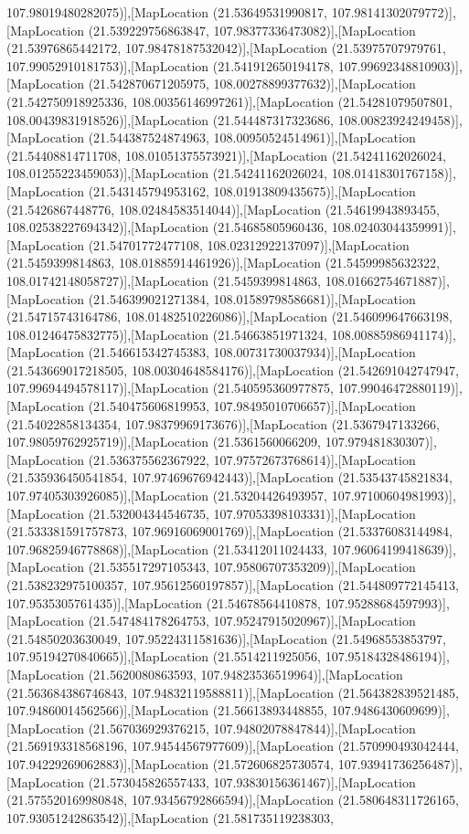 107.98019480282075)],[MapLocation (21.53649531990817, 107.98141302079772)],[MapLocation (21.539229756863847, 107.98377336473082)],[MapLocation (21.53976865442172, 107.98478187532042)],[MapLocation (21.53975707979761, 107.99052910181753)],[MapLocation (21.541912650194178, 107.99692348810903)],[MapLocation (21.542870671205975, 108.00278899377632)],[MapLocation (21.542750918925336, 108.00356146997261)],[MapLocation (21.54281079507801, 108.00439831918526)],[MapLocation (21.544487317323686, 108.00823924249458)],[MapLocation (21.544387524874963, 108.00950524514961)],[MapLocation (21.54408814711708, 108.01051375573921)],[MapLocation (21.54241162026024, 108.01255223459053)],[MapLocation (21.54241162026024, 108.01418301767158)],[MapLocation (21.543145794953162, 108.01913809435675)],[MapLocation (21.5426867448776, 108.02484583514044)],[MapLocation (21.54619943893455, 108.02538227694342)],[MapLocation (21.54685805960436, 108.02403044359991)],[MapLocation (21.54701772477108, 108.02312922137097)],[MapLocation (21.5459399814863, 108.01885914461926)],[MapLocation (21.54599985632322, 108.01742148058727)],[MapLocation (21.5459399814863, 108.01662754671887)],[MapLocation (21.546399021271384, 108.01589798586681)],[MapLocation (21.54715743164786, 108.01482510226086)],[MapLocation (21.546099647663198, 108.01246475832775)],[MapLocation (21.54663851971324, 108.00885986941174)],[MapLocation (21.546615342745383, 108.00731730037934)],[MapLocation (21.543669017218505, 108.00304648584176)],[MapLocation (21.542691042747947, 107.99694494578117)],[MapLocation (21.540595360977875, 107.99046472880119)],[MapLocation (21.540475606819953, 107.98495010706657)],[MapLocation (21.54022858134354, 107.98379969173676)],[MapLocation (21.5367947133266, 107.98059762925719)],[MapLocation (21.5361560066209, 107.979481830307)],[MapLocation (21.536375562367922, 107.97572673768614)],[MapLocation (21.535936450541854, 107.97469676942443)],[MapLocation (21.53543745821834, 107.97405303926085)],[MapLocation (21.53204426493957, 107.97100604981993)],[MapLocation (21.532004344546735, 107.97053398103331)],[MapLocation (21.533381591757873, 107.96916069001769)],[MapLocation (21.53376083144984, 107.96825946778868)],[MapLocation (21.53412011024433, 107.96064199418639)],[MapLocation (21.535517297105343, 107.95806707353209)],[MapLocation (21.538232975100357, 107.95612560197857)],[MapLocation (21.544809772145413, 107.9535305761435)],[MapLocation (21.54678564410878, 107.95288684597993)],[MapLocation (21.547484178264753, 107.95247915020967)],[MapLocation (21.54850203630049, 107.95224311581636)],[MapLocation (21.54968553853797, 107.95194270840665)],[MapLocation (21.5514211925056, 107.95184328486194)],[MapLocation (21.5620080863593, 107.94823536519964)],[MapLocation (21.563684386746843, 107.94832119588811)],[MapLocation (21.564382839521485, 107.94860014562566)],[MapLocation (21.56613893448855, 107.9486430609699)],[MapLocation (21.567036929376215, 107.94802078847844)],[MapLocation (21.569193318568196, 107.94544567977609)],[MapLocation (21.570990493042444, 107.94229269062883)],[MapLocation (21.572606825730574, 107.93941736256487)],[MapLocation (21.573045826557433, 107.93830156361467)],[MapLocation (21.575520169980848, 107.93456792866594)],[MapLocation (21.580648311726165, 107.93051242863542)],[MapLocation (21.581735119238303, 